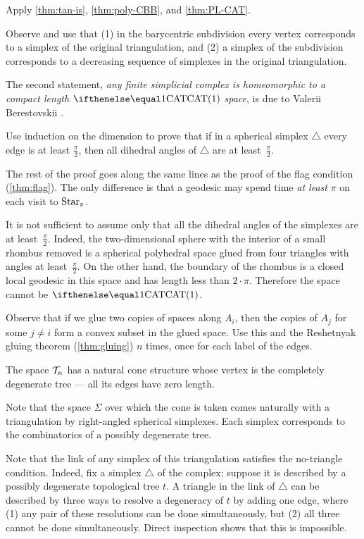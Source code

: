 Apply \ref{thm:tan-is}, \ref{thm:poly-CBB}, and \ref{thm:PL-CAT}.

Observe and use that (1) in the barycentric subdivision every vertex corresponds to a simplex of the original triangulation,
and (2) a simplex of the subdivision corresponds to a decreasing sequence of simplexes in the original triangulation. 

The second statement, \textit{any finite  simplicial complex is homeomorphic to a compact length $\CAT1$ space}, is due to Valerii Berestovskii \cite{berestovskii}.

Use induction on the dimension  to prove that if in a spherical simplex $\triangle$ every edge is at least $\tfrac\pi2$, then 
all dihedral angles of $\triangle$ are at least~$\tfrac\pi2$.

The rest of the proof goes along the same lines as the proof of the flag condition (\ref{thm:flag}).
The only difference is that a geodesic may spend time \textit{at least} $\pi$ on each visit to $\mathop{\rm Star}\nolimits_v$.

It is not sufficient to assume only that all the dihedral angles of the simplexes are at least~$\tfrac\pi2$. 
Indeed, the two-dimensional sphere with the interior of a small rhombus removed is a spherical polyhedral space glued from four triangles with angles at least~$\tfrac\pi2$.
On the other hand, the boundary of the rhombus is a closed local geodesic in this space and has length less than $2\cdot\pi$.
Therefore the space cannot be $\CAT1$.

Observe that if we glue two copies of spaces along $A_i$, then the copies of $A_j$ for some $j\ne i$ form a convex subset in the glued space.
Use this and the Reshetnyak gluing theorem (\ref{thm:gluing}) $n$ times, once for each label of the edges.

The space $\mathcal{T}_n$ has a natural cone structure whose vertex is the  completely degenerate tree --- all its edges have zero length.

Note that the space $\Sigma$
over which the cone is taken comes naturally with a triangulation 
by right-angled spherical simplexes.
Each simplex corresponds to the combinatorics of a possibly degenerate tree.

Note that the link of any simplex of this triangulation satisfies the no-triangle condition.
Indeed, fix a simplex $\triangle$ of the complex;
suppose it is described by a possibly degenerate topological tree $t$.
A triangle in the link of  $\triangle$ can be described by three ways to resolve a degeneracy of $t$ by adding one edge, where 
(1) any pair of these resolutions can be done simultaneously, but (2) all three cannot be done simultaneously.
Direct inspection shows that this is impossible.

